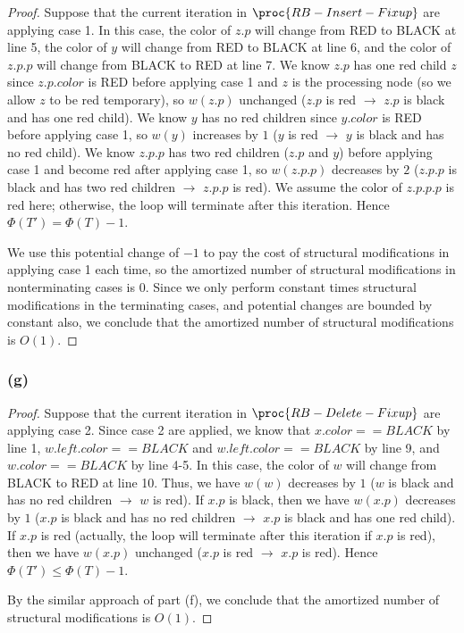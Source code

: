\begin{proof}
    Suppose that the current iteration in $\proc{RB-Insert-Fixup}$ are applying case 1.
    In this case, the color of $z.p$ will change from RED to BLACK at line 5,
    the color of $y$ will change from RED to BLACK at line 6,
    and the color of $z.p.p$ will change from BLACK to RED at line 7.
    We know $z.p$ has one red child $z$ since $z.p.color$ is RED before applying case 1
    and $z$ is the processing node (so we allow $z$ to be red temporary),
    so $w(z.p)$ unchanged ($z.p$ is red $\rightarrow$ $z.p$ is black and has one red child).
    We know $y$ has no red children since $y.color$ is RED before applying case 1,
    so $w(y)$ increases by $1$ ($y$ is red $\rightarrow$ $y$ is black and has no red child).
    We know $z.p.p$ has two red children ($z.p$ and $y$) before applying case 1
    and become red after applying case 1,
    so $w(z.p.p)$ decreases by $2$ 
    ($z.p.p$ is black and has two red children $\rightarrow$ $z.p.p$ is red).
    We assume the color of $z.p.p.p$ is red here;
    otherwise, the loop will terminate after this iteration.
    Hence $\Phi(T') = \Phi(T) - 1$.

    We use this potential change of $-1$ to 
    pay the cost of structural modifications in applying case 1 each time,
    so the amortized number of structural modifications in nonterminating cases is $0$.
    Since we only perform constant times structural modifications in the terminating cases,
    and potential changes are bounded by constant also,
    we conclude that the amortized number of structural modifications is $O(1)$.
\end{proof}

\subsubsection*{(g)}

\begin{proof}
    Suppose that the current iteration in $\proc{RB-Delete-Fixup}$ are applying case 2.
    Since case 2 are applied, we know that $x.color == BLACK$ by line 1,
    $w.left.color == BLACK$ and $w.left.color == BLACK$ by line 9,
    and $w.color == BLACK$ by line 4-5.
    In this case, the color of $w$ will change from BLACK to RED at line 10.
    Thus, we have 
    $w(w)$ decreases by $1$ ($w$ is black and has no red children $\rightarrow$ $w$ is red).
    If $x.p$ is black, then we have $w(x.p)$ decreases by $1$ 
    ($x.p$ is black and has no red children $\rightarrow$ $x.p$ is black and has one red child).
    If $x.p$ is red (actually, the loop will terminate after this iteration if $x.p$ is red), 
    then we have $w(x.p)$ unchanged ($x.p$ is red $\rightarrow$ $x.p$ is red).
    Hence $\Phi(T') \leq \Phi(T) - 1$.

    By the similar approach of part (f),
    we conclude that the amortized number of structural modifications is $O(1)$.
\end{proof}

